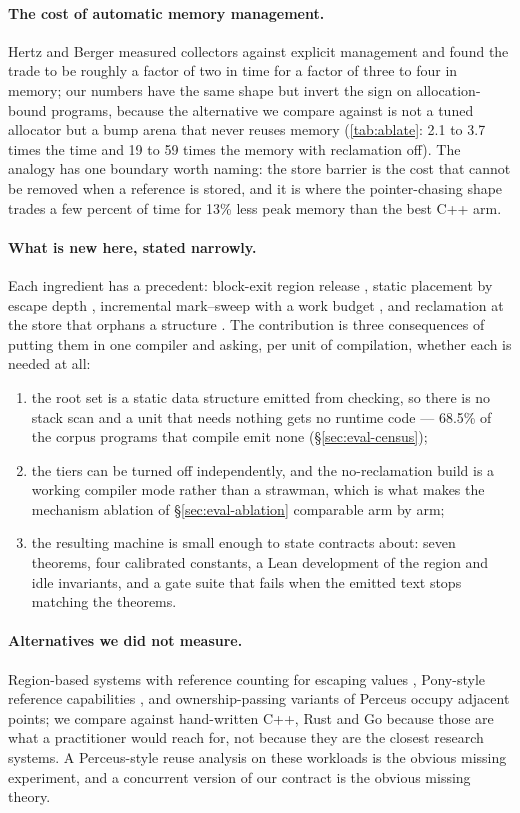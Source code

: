\paragraph{The cost of automatic memory management.}
Hertz and Berger \cite{hertz2005quantifying} measured collectors against explicit management and
found the trade to be roughly a factor of two in time for a factor of three to four in memory; our
numbers have the same shape but invert the sign on allocation-bound programs, because the
alternative we compare against is not a tuned allocator but a bump arena that never reuses memory
(\tab\ref{tab:ablate}: 2.1 to 3.7 times the time and 19 to 59 times the memory with reclamation
off).  The analogy has one boundary worth naming: the store barrier is the cost that cannot be
removed when a reference is stored, and it is where the pointer-chasing shape trades a few percent
of time for 13\% less peak memory than the best C++ arm.

\paragraph{What is new here, stated narrowly.}
Each ingredient has a precedent: block-exit region release \cite{tofte1997region}, static
placement by escape depth \cite{choi1999escape}, incremental mark--sweep with a work budget
\cite{blackburn2008immix,bacon2003realtime}, and reclamation at the store that orphans a structure
\cite{collins1960}.  The contribution is three consequences of putting them in one compiler and
asking, per unit of compilation, whether each is needed at all:
\begin{enumerate}
\item the root set is a static data structure emitted from checking, so there is no stack scan and a
unit that needs nothing gets no runtime code — 68.5\% of the corpus programs that compile emit
none (\S\ref{sec:eval-census});
\item the tiers can be turned off independently, and the no-reclamation build is a working compiler
mode rather than a strawman, which is what makes the mechanism ablation of
\S\ref{sec:eval-ablation} comparable arm by arm;
\item the resulting machine is small enough to state contracts about: seven theorems, four
calibrated constants, a Lean development of the region and idle invariants, and a gate suite that
fails when the emitted text stops matching the theorems.
\end{enumerate}

\paragraph{Alternatives we did not measure.}
Region-based systems with reference counting for escaping values \cite{grossman2002cyclone},
Pony-style reference capabilities \cite{clebsch2013pony}, and ownership-passing variants of
Perceus occupy adjacent points; we compare against hand-written C++, Rust and Go because those are
what a practitioner would reach for, not because they are the closest research systems.  A
Perceus-style reuse analysis on these workloads is the obvious missing experiment, and a
concurrent version of our contract is the obvious missing theory.
